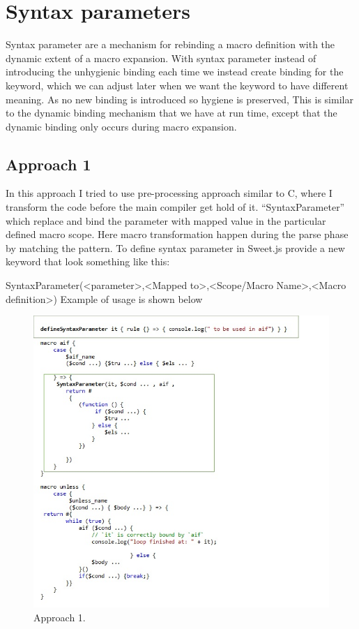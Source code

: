 \chapter{Syntax parameters}

Syntax parameter are a mechanism for rebinding a macro definition with the dynamic extent of a macro expansion. With syntax parameter instead of introducing the unhygienic binding each time we instead create binding for the keyword, which we can adjust later when we want the keyword to have different meaning. As no new binding is introduced so hygiene is preserved, This is similar to the dynamic binding mechanism that we have at run time, except that the dynamic binding only occurs during macro expansion.

\section{Approach 1}

In this approach I tried to use pre-processing approach similar to C, where I transform the code before the main compiler get hold of it. “SyntaxParameter” which replace and bind the parameter with  mapped value in the particular defined macro scope. Here macro transformation happen during the parse phase by matching the pattern. To define syntax parameter in Sweet.js provide a new keyword that look something like this:  

SyntaxParameter(<parameter>,<Mapped to>,<Scope/Macro Name>,<Macro definition>)
\newpage
Example of usage is shown below 

\begin{figure}[htb]
\centering
\includegraphics[width=1.0\textwidth]{images/Appraoch1.jpg}
\caption{Approach 1.} 
\label{fig:AST}

\end{figure}

